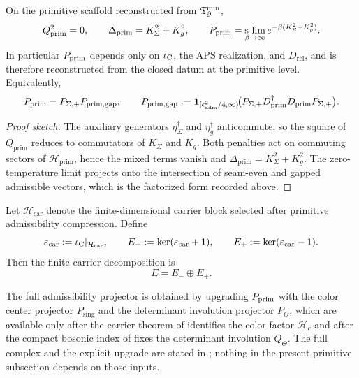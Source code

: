 \begin{lemma}
\label{lem:admissibility-nilpotency}
\label{lem:hodge-admissibility-projector}
\label{lem:primitive-admissibility-nilpotency}
On the primitive scaffold reconstructed from $\mathfrak T_{\partial}^{\min}$,
\[
Q_{\mathrm{prim}}^2=0,
\qquad
\Delta_{\mathrm{prim}}
=
K_\Sigma^2+K_g^2,
\qquad
P_{\mathrm{prim}}
=
\operatorname*{s-lim}_{\beta\to\infty}e^{-\beta(K_\Sigma^2+K_g^2)}.
\]
In particular $P_{\mathrm{prim}}$ depends only on $\iota_{\mathrm C}$, the APS realization, and $D_{\mathrm{rel}}$, and
is therefore reconstructed from the closed datum at the primitive level. Equivalently,
\[
P_{\mathrm{prim}}=P_{\Sigma,+}P_{\mathrm{prim,gap}},
\qquad
P_{\mathrm{prim,gap}}
:=
\mathbf 1_{[\epsilon_{\mathrm{adm}}^2/4,\infty)}
\!\bigl(P_{\Sigma,+}D_{\mathrm{prim}}^\dagger D_{\mathrm{prim}}P_{\Sigma,+}\bigr).
\]
\end{lemma}

\begin{proof}[Proof sketch]
The auxiliary generators $\eta_\Sigma^\dagger$ and $\eta_g^\dagger$ anticommute, so the square
of $Q_{\mathrm{prim}}$ reduces to commutators of $K_\Sigma$ and $K_g$. Both penalties act on
commuting sectors of $\mathcal H_{\mathrm{prim}}$, hence the mixed terms vanish and
$\Delta_{\mathrm{prim}}=K_\Sigma^2+K_g^2$. The zero-temperature limit projects onto the
intersection of seam-even and gapped admissible vectors, which is the factorized form recorded
above.
\end{proof}

\begin{definition}
\label{def:carrier-polarization-involution}
Let $\mathcal H_{\mathrm{car}}$ denote the finite-dimensional carrier block selected after
primitive admissibility compression. Define
\[
\varepsilon_{\mathrm{car}}:=\iota_{\mathrm C}|_{\mathcal H_{\mathrm{car}}},
\qquad
E_-:=\ker(\varepsilon_{\mathrm{car}}+1),
\qquad
E_+:=\ker(\varepsilon_{\mathrm{car}}-1).
\]
Then the finite carrier decomposition is
\[
E=E_-\oplus E_+.
\]
\end{definition}

\begin{remark}
\label{rem:forward-Padm}
The full admissibility projector is obtained by upgrading $P_{\mathrm{prim}}$ with the color center
projector $P_{\mathrm{sing}}$ and the determinant involution projector $P_\Theta$, which are
available only after the carrier theorem of  identifies the
color factor $\mathcal H_c$ and after the compact bosonic index of 
fixes the determinant involution $Q_\Theta$. The full complex and the explicit upgrade are
stated in ; nothing in the present
primitive subsection depends on those inputs.
\end{remark}

